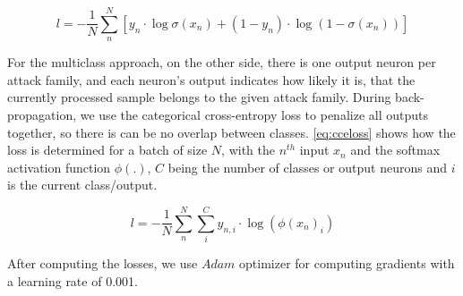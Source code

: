 \documentclass[conference]{IEEEtran}
\begin{document}
\begin{equation}
\label{eq:bceloss}
l = - \frac{1}{N} \sum_{n}^{N} [y_n \cdot \log \sigma (x_{n}) + (1 - y_n) \cdot \log (1 - \sigma (x_{n}))]
\end{equation}

For the multiclass approach, on the other side, there is one output neuron per attack family, and each neuron's output indicates how likely it is, that the currently processed sample belongs to the given attack family. During back-propagation, we use the categorical cross-entropy loss to penalize all outputs together, so there is can be no overlap between classes. \autoref{eq:cceloss} shows how the loss is determined for a batch of size $N$, with the $n^{th}$ input $x_{n}$ and the softmax activation function \cite{noauthor_softmax_2020} $\phi(.)$, $C$ being the number of classes or output neurons and $i$ is the current class/output.

\begin{equation}
\label{eq:cceloss}
l = - \frac{1}{N} \sum_{n}^{N} \sum_{i}^{C} y_{n,i} \cdot \log (\phi(x_{n})_{i})
\end{equation}

After computing the losses, we use $Adam$ optimizer \cite{kingma_adam_2017} for computing gradients with a learning rate of 0.001.
\end{document}
